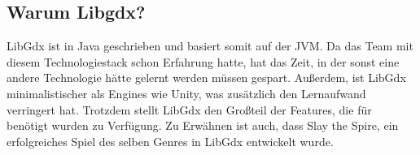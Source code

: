 
\subsection{Warum Libgdx?}\label{subsec:warum-libgdx}

\renewcommand{\kapitelautor}{Autor: Marvin Kurka}

LibGdx ist in Java geschrieben und basiert somit auf der JVM.
Da das Team mit diesem Technologiestack schon Erfahrung hatte, hat das Zeit, in der sonst eine andere Technologie
hätte gelernt werden müssen gespart.
Außerdem, ist LibGdx minimalistischer als Engines wie Unity, was zusätzlich den Lernaufwand verringert hat.
Trotzdem stellt LibGdx den Großteil der Features, die für \FF benötigt wurden zu Verfügung.
Zu Erwähnen ist auch, dass Slay the Spire, ein erfolgreiches Spiel des selben Genres in LibGdx entwickelt wurde.\cite{libgdxShowcase}

\renewcommand{\kapitelautor}{}
